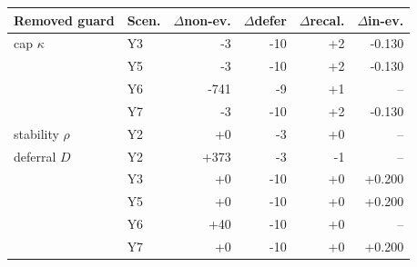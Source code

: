 \begin{tabular}{llrrrr}
\toprule
Removed guard & Scen. & $\Delta$non-ev. & $\Delta$defer & $\Delta$recal. & $\Delta$in-ev. \\
\midrule
cap $\kappa$ & Y3 & -3 & -10 & +2 & -0.130 \\
 & Y5 & -3 & -10 & +2 & -0.130 \\
 & Y6 & -741 & -9 & +1 & -- \\
 & Y7 & -3 & -10 & +2 & -0.130 \\
\midrule
stability $\rho$ & Y2 & +0 & -3 & +0 & -- \\
\midrule
deferral $D$ & Y2 & +373 & -3 & -1 & -- \\
 & Y3 & +0 & -10 & +0 & +0.200 \\
 & Y5 & +0 & -10 & +0 & +0.200 \\
 & Y6 & +40 & -10 & +0 & -- \\
 & Y7 & +0 & -10 & +0 & +0.200 \\
\bottomrule
\end{tabular}%

